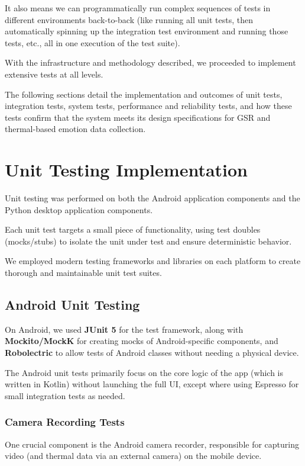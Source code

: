 {{{It also means we can programmatically run complex sequences of tests in different environments back-to-back (like running all unit tests, then automatically spinning up the integration test environment and running those tests, etc., all in one execution of the test suite).

With the infrastructure and methodology described, we proceeded to implement extensive tests at all levels.

The following sections detail the implementation and outcomes of unit tests, integration tests, system tests, performance and reliability tests, and how these tests confirm that the system meets its design specifications for GSR and thermal-based emotion data collection.

\section{Unit Testing Implementation}

Unit testing was performed on both the Android application components and the Python desktop application components.

Each unit test targets a small piece of functionality, using test doubles (mocks/stubs) to isolate the unit under test and ensure deterministic behavior.

We employed modern testing frameworks and libraries on each platform to create thorough and maintainable unit test suites.

\subsection{Android Unit Testing}

On Android, we used \textbf{JUnit 5}
 for the test framework, along with \textbf{Mockito/MockK}
 for creating mocks of Android-specific components, and \textbf{Robolectric}
 to allow tests of Android classes without needing a physical device.

The Android unit tests primarily focus on the core logic of the app (which is written in Kotlin) without launching the full UI, except where using Espresso for small integration tests as needed.

\subsubsection{Camera Recording Tests}

One crucial component is the Android camera recorder, responsible for capturing video (and thermal data via an external camera) on the mobile device.

}}}
